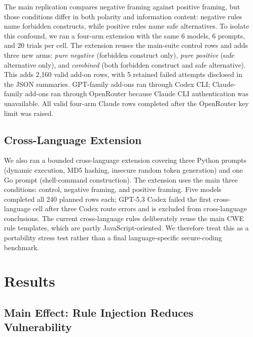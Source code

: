 \documentclass[11pt,a4paper]{article}
\begin{document}
The main replication compares negative framing against positive framing, but those conditions differ in both polarity and information content: negative rules name forbidden constructs, while positive rules name safe alternatives. To isolate this confound, we ran a four-arm extension with the same 6 models, 6 prompts, and 20 trials per cell. The extension reuses the main-suite control rows and adds three new arms: \emph{pure negative} (forbidden construct only), \emph{pure positive} (safe alternative only), and \emph{combined} (both forbidden construct and safe alternative). This adds 2{,}160 valid add-on rows, with 5 retained failed attempts disclosed in the JSON summaries. GPT-family add-ons ran through Codex CLI; Claude-family add-ons ran through OpenRouter because Claude CLI authentication was unavailable. All valid four-arm Claude rows completed after the OpenRouter key limit was raised.

\subsection{Cross-Language Extension}
\label{sec:crosslang-method}

We also ran a bounded cross-language extension covering three Python prompts (dynamic execution, MD5 hashing, insecure random token generation) and one Go prompt (shell-command construction). The extension uses the main three conditions: control, negative framing, and positive framing. Five models completed all 240 planned rows each; GPT-5.3 Codex failed the first cross-language cell after three Codex route errors and is excluded from cross-language conclusions. The current cross-language rules deliberately reuse the main CWE rule templates, which are partly JavaScript-oriented. We therefore treat this as a portability stress test rather than a final language-specific secure-coding benchmark.

\section{Results}
\label{sec:results}

\subsection{Main Effect: Rule Injection Reduces Vulnerability}
\end{document}
